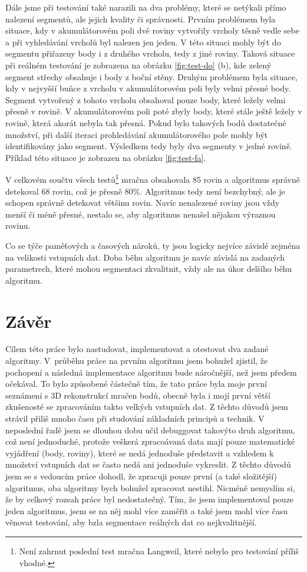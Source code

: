\documentclass[11pt,twoside,a4paper]{book}
\begin{document}
Dále jsme při testování také narazili na dva problémy, které se netýkali přímo nalezení segmentů, ale jejich kvality či správnosti. Prvním problémem byla situace, kdy v akumulátorovém poli dvě roviny vytvořily vrcholy těsně vedle sebe a při vyhledávání vrcholů byl nalezen jen jeden. V této situaci mohly být do segmentu přiřazeny body i z druhého vrcholu, tedy z jiné roviny. Taková situace při reálném testování je zobrazena na obrázku \ref{fig:test-do} (b), kde zelený segment střechy obsahuje i body z boční stěny. Druhým problémem byla situace, kdy v nejvyšší buňce z vrcholu v akumulátorovém poli byly velmi přesné body. Segment vytvořený z tohoto vrcholu obsahoval pouze body, které ležely velmi přesně v rovině. V akumulátorovém poli poté zbyly body, které stále ještě ležely v rovině, která akorát nebyla tak přesná. Pokud bylo takových bodů dostatečné množství, při další iteraci prohledávání akumulátorového pole mohly být identifikovány jako segment. Výsledkem tedy byly dva segmenty v jedné rovině. Příklad této situace je zobrazen na obrázku \ref{fig:test-fa}.

V celkovém součtu všech testů\footnote{Není zahrnut poslední test mračna Langweil, které nebylo pro testování příliš vhodné.} mračna obsahovala 85 rovin a algoritmus správně detekoval 68 rovin, což je přesně 80\%. Algoritmus tedy není bezchybný, ale je schopen správně detekovat většinu rovin. Navíc nenalezené roviny jsou vždy menší či méně přesné, nestalo se, aby algoritmus nenašel nějakou výraznou rovinu.

Co se týče paměťových a časových nároků, ty jsou logicky nejvíce závislé zejména na velikosti vstupních dat. Doba běhu algoritmu je navíc závislá na zadaných parametrech, které mohou segmentaci zkvalitnit, vždy ale na úkor delšího běhu algoritmu.


\chapter{Závěr}

Cílem této práce bylo nastudovat, implementovat a otestovat dva zadané algoritmy. V~průběhu práce na prvním algoritmu jsem bohužel zjistil, že pochopení a následná implementace algoritmu bude náročnější, než jsem předem očekával. To bylo způsobené částečně tím, že tato práce byla moje první seznámení s 3D rekonstrukcí mračen bodů, obecně byla i mojí první větší zkušenosté se zpracováním takto velkých vstupních dat. Z těchto důvodů jsem strávil přiliš mnoho času při studování základních principů a technik. V neposlední řadě jsem se dlouhou dobu učil debuggovat takovýto druh algoritmu, což není jednoduché, protože veškerá zpracoávaná data mají pouze matematické vyjádření (body, roviny), které se nedá jednoduše představit a vzhledem k množství vstupních dat se často nedá ani jednoduše vykreslit. Z těchto důvodů jsem se s vedoucím práce dohodl, že zpracuji pouze první (a také složitější) algoritmus, oba algoritmy bych bohužel zpracovat nestihl. Nicméně nemyslím si, že by celkový rozsah práce byl nedostatečný. Tím, že jsem implementoval pouze jeden algoritmus, jsem se na něj mohl více zaměřit a také jsem mohl více času věnovat testování, aby bzla segmentace reálných dat co nejkvalitnější.
\end{document}
